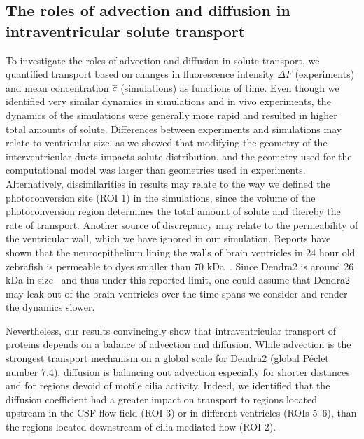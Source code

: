 \documentclass{WileyMSP-template}
\begin{document}
\subsection{The roles of advection and diffusion in intraventricular solute transport}
To investigate the roles of advection and diffusion in solute transport, we quantified transport
based on changes in fluorescence intensity $\Delta F$ (experiments) and
mean concentration $\overline{c}$ (simulations) as functions of time.
Even though we identified very similar dynamics in simulations and
in vivo experiments, the dynamics of the simulations were generally
more rapid and resulted in higher total amounts of solute.
Differences between experiments and simulations may relate to
ventricular size, as we showed that modifying the geometry of the interventricular ducts
impacts solute distribution, and the geometry used for the computational model was larger
than geometries used in experiments. Alternatively, dissimilarities in results may relate
to the way we defined the photoconversion site (ROI 1) in the simulations,
since the volume of the photoconversion region determines
the total amount of solute and thereby the rate of transport. Another source
of discrepancy may relate to the permeability of the ventricular wall,
which we have ignored in our simulation. Reports have shown that the
neuroepithelium lining the walls of brain ventricles in 24 hour old zebrafish
is permeable to dyes smaller than 70 kDa~\cite{Chang2012AnNeuroepithelium}.
Since Dendra2 is around 26 kDa in size~\cite{Gurskaya2006EngineeringLight} and
thus under this reported limit, one could assume that Dendra2 may
leak out of the brain ventricles over the time spans we consider
and render the dynamics slower.

Nevertheless, our results convincingly show that
intraventricular transport of proteins depends on a balance of advection and diffusion.
While advection is the strongest transport mechanism on a global scale for
Dendra2 (global Péclet number 7.4), diffusion is balancing out
advection especially for shorter distances and for regions devoid of motile cilia activity.
Indeed, we identified that the diffusion coefficient had a greater impact on transport to
regions located upstream in the CSF flow field (ROI 3) or in different ventricles (ROIs 5--6),
than the regions located downstream of cilia-mediated flow (ROI 2). 
\end{document}
